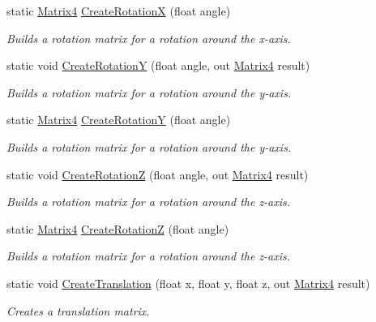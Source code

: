 \begin{DoxyCompactItemize}
static \hyperlink{struct_open_t_k_1_1_matrix4}{Matrix4} \hyperlink{struct_open_t_k_1_1_matrix4_adaf85e0d85e19232443488b420218691}{Create\-Rotation\-X} (float angle)
\begin{DoxyCompactList}\small\item\em Builds a rotation matrix for a rotation around the x-\/axis. \end{DoxyCompactList}\item 
static void \hyperlink{struct_open_t_k_1_1_matrix4_a1d9e19fb035840436efee575a60d652b}{Create\-Rotation\-Y} (float angle, out \hyperlink{struct_open_t_k_1_1_matrix4}{Matrix4} result)
\begin{DoxyCompactList}\small\item\em Builds a rotation matrix for a rotation around the y-\/axis. \end{DoxyCompactList}\item 
static \hyperlink{struct_open_t_k_1_1_matrix4}{Matrix4} \hyperlink{struct_open_t_k_1_1_matrix4_afd2e6c5a4334ca387b26df8e7508741e}{Create\-Rotation\-Y} (float angle)
\begin{DoxyCompactList}\small\item\em Builds a rotation matrix for a rotation around the y-\/axis. \end{DoxyCompactList}\item 
static void \hyperlink{struct_open_t_k_1_1_matrix4_a4e315fd9139ce8d3c4bebb18f42a39a7}{Create\-Rotation\-Z} (float angle, out \hyperlink{struct_open_t_k_1_1_matrix4}{Matrix4} result)
\begin{DoxyCompactList}\small\item\em Builds a rotation matrix for a rotation around the z-\/axis. \end{DoxyCompactList}\item 
static \hyperlink{struct_open_t_k_1_1_matrix4}{Matrix4} \hyperlink{struct_open_t_k_1_1_matrix4_a175b1c322b20077f1d5ee26b10736a2d}{Create\-Rotation\-Z} (float angle)
\begin{DoxyCompactList}\small\item\em Builds a rotation matrix for a rotation around the z-\/axis. \end{DoxyCompactList}\item 
static void \hyperlink{struct_open_t_k_1_1_matrix4_a2f34dc7c103f9a96bd7fb14db7fcf895}{Create\-Translation} (float x, float y, float z, out \hyperlink{struct_open_t_k_1_1_matrix4}{Matrix4} result)
\begin{DoxyCompactList}\small\item\em Creates a translation matrix. \end{DoxyCompactList}\item 

\end{DoxyCompactItemize}
